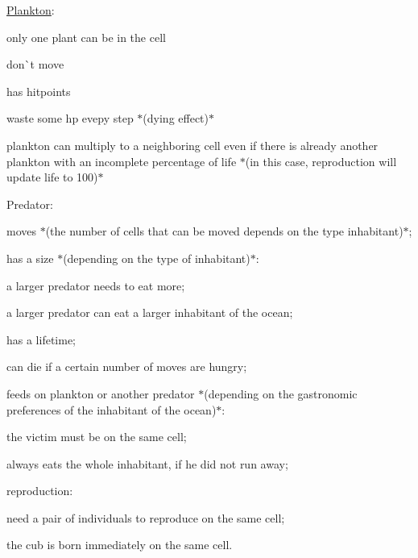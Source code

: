 \begin{DoxyItemize}
\item \mbox{\hyperlink{class_plankton}{Plankton}}\+:
\begin{DoxyItemize}
\item only one plant can be in the cell
\item don\`{}t move
\item has hitpoints
\begin{DoxyItemize}
\item waste some hp evepy step $\ast$(dying effect)$\ast$
\item plankton can multiply to a neighboring cell even if there is already another plankton with an incomplete percentage of life $\ast$(in this case, reproduction will update life to 100)$\ast$
\end{DoxyItemize}
\end{DoxyItemize}
\item Predator\+:
\begin{DoxyItemize}
\item moves $\ast$(the number of cells that can be moved depends on the type inhabitant)$\ast$;
\item has a size $\ast$(depending on the type of inhabitant)$\ast$\+:
\begin{DoxyItemize}
\item a larger predator needs to eat more;
\item a larger predator can eat a larger inhabitant of the ocean;
\end{DoxyItemize}
\item has a lifetime;
\item can die if a certain number of moves are hungry;
\item feeds on plankton or another predator $\ast$(depending on the gastronomic preferences of the inhabitant of the ocean)$\ast$\+:
\begin{DoxyItemize}
\item the victim must be on the same cell;
\item always eats the whole inhabitant, if he did not run away;
\end{DoxyItemize}
\item reproduction\+:
\begin{DoxyItemize}
\item need a pair of individuals to reproduce on the same cell;
\item the cub is born immediately on the same cell.
\end{DoxyItemize}
\end{DoxyItemize}
\end{DoxyItemize}

